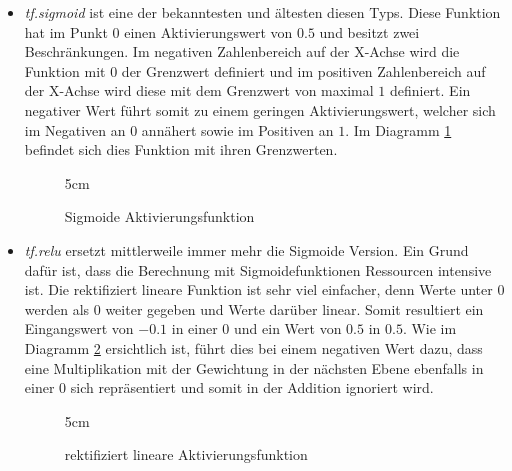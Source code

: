 \begin{itemize}
	\item \textit{tf.sigmoid} ist eine der bekanntesten und ältesten diesen Typs.
	Diese Funktion hat im Punkt $0$ einen Aktivierungswert von $0.5$ und besitzt zwei Beschränkungen. 
	Im negativen Zahlenbereich auf der X-Achse wird die Funktion mit $0$ der Grenzwert definiert und im positiven Zahlenbereich auf der X-Achse wird diese mit dem Grenzwert von maximal $1$ definiert. 
	Ein negativer Wert führt somit zu einem geringen Aktivierungswert, welcher sich im Negativen an $0$ annähert sowie im Positiven an $1$.
	Im Diagramm \ref{fig:Sigmoide Aktivierungsfunktion} befindet sich dies Funktion mit ihren Grenzwerten. 
\begin{figure}
	\centering
	\resizebox {\linewidth} {5cm} {
	}
	\caption{Sigmoide Aktivierungsfunktion}
	\label{fig:Sigmoide Aktivierungsfunktion}
\end{figure}

	\item \textit{tf.relu} ersetzt mittlerweile immer mehr die Sigmoide Version. 
	Ein Grund dafür ist, dass die Berechnung mit Sigmoidefunktionen Ressourcen intensive ist. 
	Die rektifiziert lineare Funktion ist sehr viel einfacher, denn Werte unter $0$ werden als $0$ weiter gegeben und Werte darüber linear. 
	Somit resultiert ein Eingangswert von $-0.1$ in einer $0$ und ein Wert von $0.5$ in $0.5$.
	Wie im Diagramm \ref{fig:rektifiziert lineare Aktivierungsfunktion} ersichtlich ist, führt dies bei einem negativen Wert dazu, dass eine Multiplikation mit der Gewichtung in der nächsten Ebene ebenfalls in einer $0$ sich repräsentiert und somit in der Addition ignoriert wird.
\begin{figure}
	\centering
	\resizebox {\linewidth} {5cm} {
	}
	\caption{rektifiziert lineare Aktivierungsfunktion}
	\label{fig:rektifiziert lineare Aktivierungsfunktion}
\end{figure}


\end{itemize}
